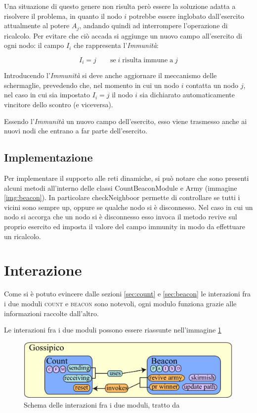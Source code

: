 \documentclass[a4paper,12pt]{article}
\begin{document}
Una situazione di questo genere non risulta per\`o essere la soluzione adatta a risolvere il problema, in quanto il nodo $i$ potrebbe essere inglobato dall'esercito attualmente al potere $A_j$, andando quindi ad interrompere l'operazione di ricalcolo. Per evitare che ci\`o accada si aggiunge un nuovo campo all'esercito di ogni nodo: il campo $I_i$ che rappresenta l'\emph{Immunit\`a}:

$$I_i = j \qquad\mathrm{se}\; i \;\mathrm{risulta\;immune\;a}\; j$$

Introducendo l'\emph{Immunit\`a} si deve anche aggiornare il meccanismo delle schermaglie, prevedendo che, nel momento in cui un nodo $i$ contatta un nodo $j$, nel caso in cui sia impostato $I_i = j$ il nodo $i$ sia dichiarato automaticamente vincitore dello scontro (e viceversa).

Essendo l'\emph{Immunit\`a} un nuovo campo dell'esercito, esso viene trasmesso anche ai nuovi nodi che entrano a far parte dell'esercito.

\subsection{Implementazione}

Per implementare il supporto alle reti dinamiche, si pu\`o notare che sono presenti alcuni metodi all'interno delle classi \textsf{CountBeaconModule} e \textsf{Army} (immagine \ref{img:beacon}). In particolare \textsf{checkNeighboor} permette di controllare se tutti i vicini sono sempre up, oppure se qualche nodo si \`e disconnesso. Nel caso in cui un nodo si accorga che un nodo si \`e disconnesso esso invoca il metodo \textsf{revive} sul proprio esercito ed imposta il valore del campo \textsf{immunity} in modo da effettuare un ricalcolo.

\section{Interazione}
\label{sec:interazione}

Come si \`e potuto evincere dalle sezioni \ref{sec:count} e \ref{sec:beacon} le interazioni fra i due moduli \textsc{count} e \textsc{beacon} sono notevoli, ogni modulo funziona grazie alle informazioni raccolte dall'altro.

Le interazioni fra i due moduli possono essere riassunte nell'immagine \ref{img:interazione}
\begin{figure}[ht]
\centering
\includegraphics[height=3cm]{interazione.png}
\caption{Schema delle interazioni fra i due moduli, tratto da \cite{rif1}}
\label{img:interazione}
\end{figure}
\end{document}

